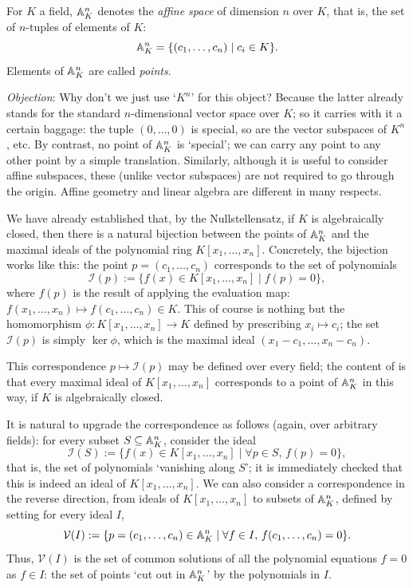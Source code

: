 For $K$ a field, $\mathbb{A}^n_K$ denotes the \emph{affine space} of dimension
$n$ over $K$, that is, the set of $n$-tuples of elements of $K$:
\[
  \mathbb{A}^n_K = \{(c_1, \dots, c_n) \mid c_i \in K\}.
\]
Elements of $\mathbb{A}^n_K$ are called \emph{points}.

\emph{Objection}: Why don't we just use `$K^n$' for this object?
Because the latter already stands for the standard $n$-dimensional
vector space over $K$; so it carries with it a certain baggage: the
tuple $(0, \dots, 0)$ is special, so are the vector subspaces of
$K^n$, etc.  By contrast, no point of $\mathbb{A}^n_K$ is `special'; we can
carry any point to any other point by a simple translation. Similarly,
although it is useful to consider affine subspaces, these (unlike
vector subspaces) are not required to go through the origin. Affine
geometry and linear algebra are different in many respects.

We have already established that, by the Nullstellensatz, if $K$ is
algebraically closed, then there is a natural bijection between the
points of $\mathbb{A}^n_K$ and the maximal ideals of the polynomial ring
$K[x_1, \dots, x_n]$. Concretely, the bijection works like this: the
point $p = (c_1, \dots, c_n)$ corresponds to the set of polynomials
\[
  \mathcal{I}(p) := \{f(x) \in K[x_1, \dots, x_n] \mid f(p) = 0\},
\]
where $f(p)$ is the result of applying the evaluation map:
$f(x_1, \dots, x_n) \mapsto f(c_1, \dots, c_n) \in K$. This of course
is nothing but the homomorphism $\phi : K[x_1, \dots, x_n] \to K$
defined by prescribing $x_i \mapsto c_i$; the set $\mathcal{I}(p)$ is
simply $\ker\phi$, which is the maximal ideal
$(x_1 - c_1, \dots, x_n - c_n)$.

This correspondence $p \mapsto \mathcal{I}(p)$ may be defined over
every field; the content of  is that every
maximal ideal of $K[x_1, \dots, x_n]$ corresponds to a point of
$\mathbb{A}^n_K$ in this way, if $K$ is algebraically closed.

It is natural to upgrade the correspondence as follows (again, over
arbitrary fields): for every subset $S \subseteq \mathbb{A}^n_K$, consider the
ideal
\[
  \mathcal{I}(S) := \{f(x) \in K[x_1, \dots, x_n] \mid \forall p \in
  S,\, f(p) = 0\},
\]
that is, the set of polynomials `vanishing along $S$'; it is
immediately checked that this is indeed an ideal of
$K[x_1, \dots, x_n]$. We can also consider a correspondence in the
reverse direction, from ideals of $K[x_1, \dots, x_n]$ to subsets of
$\mathbb{A}^n_K$, defined by setting for every ideal $I$,
\[
  \mathcal{V}(I) := \{p = (c_1, \dots, c_n) \in \mathbb{A}^n_K \mid \forall f
  \in I,\, f(c_1, \dots, c_n) = 0\}.
\]
Thus, $\mathcal{V}(I)$ is the set of common solutions of all the
polynomial equations $f = 0$ as $f \in I$: the set of points `cut out
in $\mathbb{A}^n_K$' by the polynomials in $I$.

